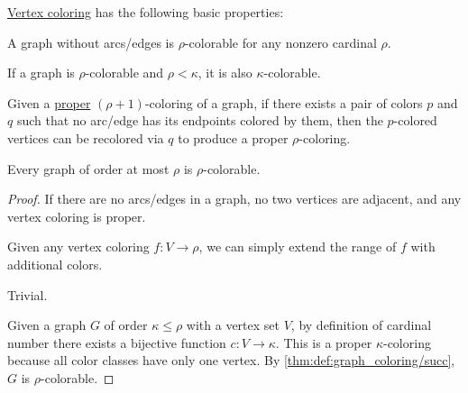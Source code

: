\begin{proposition}\label{thm:def:graph_coloring}
  \hyperref[def:multipartite_graph]{Vertex coloring} has the following basic properties:
  \begin{thmenum}
     A graph without arcs/edges is \( \rho \)-colorable for any nonzero cardinal \( \rho \).

     If a graph is \( \rho \)-colorable and \( \rho < \kappa \), it is also \( \kappa \)-colorable.

     Given a \hyperref[def:graph_coloring/proper]{proper} \( (\rho + 1) \)-coloring of a graph, if there exists a pair of colors \( p \) and \( q \) such that no arc/edge has its endpoints colored by them, then the \( p \)-colored vertices can be recolored via \( q \) to produce a proper \( \rho \)-coloring.

     Every graph of order at most \( \rho \) is \( \rho \)-colorable.
  \end{thmenum}
\end{proposition}
\begin{proof}
   If there are no arcs/edges in a graph, no two vertices are adjacent, and any vertex coloring is proper.

   Given any vertex coloring \( f: V \to \rho \), we can simply extend the range of \( f \) with additional colors.

   Trivial.

   Given a graph \( G \) of order \( \kappa \leq \rho \) with a vertex set \( V \), by definition of cardinal number there exists a bijective function \( c: V \to \kappa \). This is a proper \( \kappa \)-coloring because all color classes have only one vertex. By \cref{thm:def:graph_coloring/succ}, \( G \) is \( \rho \)-colorable.
\end{proof}

